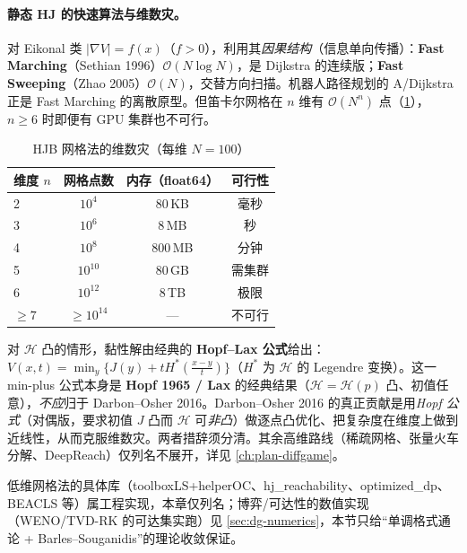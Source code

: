 \paragraph{静态 HJ 的快速算法与维数灾。}对 Eikonal 类 $|\nabla V|=f(x)$（$f>0$），利用其\emph{因果结构}（信息单向传播）：\textbf{Fast Marching}（Sethian 1996\cite{sethian1996fmm}）$\mathcal O(N\log N)$，是 Dijkstra 的连续版；\textbf{Fast Sweeping}（Zhao 2005\cite{zhao2005fsm}）$\mathcal O(N)$，交替方向扫描。机器人路径规划的 A\*/Dijkstra 正是 Fast Marching 的离散原型。但笛卡尔网格在 $n$ 维有 $\mathcal O(N^n)$ 点（\cref{tab:dp-num-curse}），$n\ge6$ 时即便有 GPU 集群也不可行。

\begin{table}[H]\centering\small
\caption{HJB 网格法的维数灾（每维 $N=100$）}
\label{tab:dp-num-curse}
\begin{tabular}{lccc}
\toprule
维度 $n$ & 网格点数 & 内存（float64） & 可行性 \\
\midrule
2 & $10^4$ & $80$\,KB & 毫秒 \\
3 & $10^6$ & $8$\,MB & 秒 \\
4 & $10^8$ & $800$\,MB & 分钟 \\
5 & $10^{10}$ & $80$\,GB & 需集群 \\
6 & $10^{12}$ & $8$\,TB & 极限 \\
$\ge7$ & $\ge10^{14}$ & --- & 不可行 \\
\bottomrule
\end{tabular}
\end{table}

\begin{remark}
对 $\mathcal H$ 凸的情形，黏性解由经典的 \textbf{Hopf--Lax 公式}给出：$V(x,t)=\min_y\{J(y)+tH^*(\tfrac{x-y}{t})\}$（$H^*$ 为 $\mathcal H$ 的 Legendre 变换）。这一 min-plus 公式本身是 \textbf{Hopf 1965 / Lax} 的经典结果（$\mathcal H=\mathcal H(p)$ 凸、初值任意），\emph{不应}归于 Darbon--Osher 2016。Darbon--Osher 2016\cite{darbon2016hopf} 的真正贡献是用\emph{Hopf 公式}（对偶版，要求初值 $J$ 凸而 $\mathcal H$ 可\emph{非凸}）做逐点凸优化、把复杂度在维度上做到近线性，从而克服维数灾。两者措辞须分清。其余高维路线（稀疏网格、张量火车分解、DeepReach）仅列名不展开，详见 \cref{ch:plan-diffgame}。
\end{remark}

低维网格法的具体库（toolboxLS+helperOC、hj\_reachability、optimized\_dp、BEACLS 等）属工程实现，本章仅列名；博弈/可达性的数值实现（WENO/TVD-RK 的可达集实跑）见 \cref{sec:dg-numerics}，本节只给“单调格式通论 + Barles--Souganidis”的理论收敛保证。

